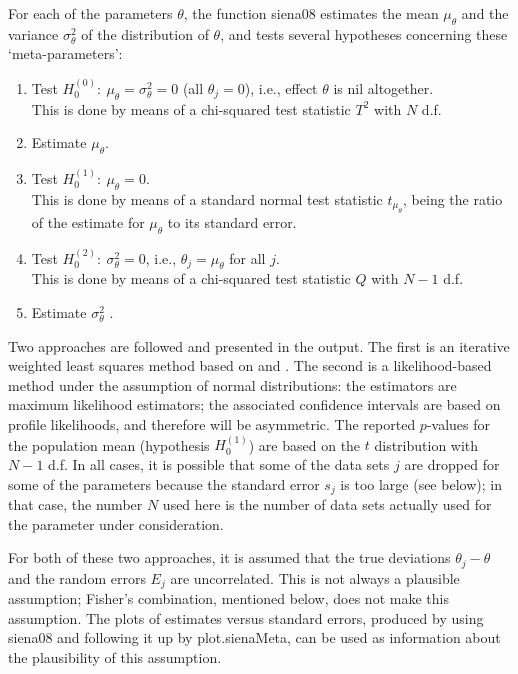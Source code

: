 \documentclass[a4paper,fleqn,11pt]{article}
\newcommand{\+}{\, + \,}
\begin{document}
For each of the parameters $\theta$, the function \textsf{siena08}
estimates the mean $\mu_\theta$
and the variance $\sigma^2_\theta$ of the distribution of $\theta$,
and tests several hypotheses concerning these `meta-parameters':
\begin{enumerate}
\item Test $H_0^{(0)}:\ \mu_\theta = \sigma^2_\theta = 0$
                       (all $\theta_j = 0$),
                      i.e., effect $\theta$ is nil altogether.\\
      This is done by means of a chi-squared test statistic $T^2$
      with $N$ d.f.
\item Estimate  $\mu_\theta $.
\item Test $H_0^{(1)}:\ \mu_\theta = 0$.\\
      This is done by means of a standard normal test statistic
      $ t_{\mu_\theta}$,
      being the ratio of the estimate for $\mu_\theta $
      to its standard error.
\item Test $H_0^{(2)}:\ \sigma^2_\theta = 0$,
                     i.e., $\theta_j = \mu_\theta$ for all $j$. \\
      This is done by means of a chi-squared test statistic $Q$
      with $N-1$ d.f.
\item Estimate  $\sigma^2_\theta$ .
\end{enumerate}
Two approaches are followed and presented in the output.
The first is an iterative weighted least squares method based on
\citet{Cochran54} and \citet{SnijdersBaerveldt03}.
The second is a likelihood-based method under the assumption
of normal distributions: the estimators are maximum likelihood
estimators; the associated confidence intervals
are based on profile likelihoods, and therefore will be
asymmetric. The reported
$p$-values for the population mean (hypothesis $H_0^{(1)}$)
are based on the $t$ distribution with $N-1$ d.f.
In all cases, it is possible that some of the data sets $j$ are
dropped for some of the parameters because the standard error $s_j$
is too large (see below);
in that case, the number $N$ used here
is the number of data sets actually used for the
parameter under consideration.

For both of these two approaches,
it is assumed that the true deviations $\theta_j - \theta$
and the random errors $E_j$ are uncorrelated.
This is not always a plausible assumption; Fisher's combination,
mentioned below, does not make this assumption.
The plots of estimates versus standard errors, produced
by using \textsf{siena08} and following it up by
\textsf{plot.sienaMeta}, can be used as information about the
plausibility of this assumption.
\end{document}
